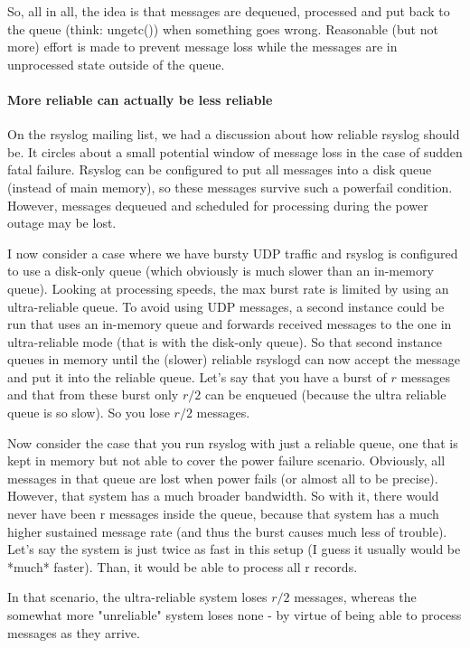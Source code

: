 \documentclass[a4paper,10pt]{article}
\begin{document}
So, all in all, the idea is that messages are dequeued, processed and put
back to the queue (think: ungetc()) when something goes wrong. Reasonable
(but not more) effort is made to prevent message loss while the messages are
in unprocessed state outside of the queue.

\paragraph{More reliable can actually be less reliable}
On the rsyslog mailing list, we had a discussion about how reliable rsyslog should be. It circles about a small potential window of message loss in the case of sudden fatal failure. Rsyslog can be configured to put all messages into a disk queue (instead of main memory), so these messages survive such a powerfail condition. However, messages dequeued and scheduled for processing during the power outage may be lost. 

I now consider a case where we have bursty UDP traffic and rsyslog is configured to use a disk-only queue (which obviously is much slower than an in-memory queue). Looking at processing speeds, the max burst rate is limited by using an ultra-reliable queue. To avoid using UDP messages, a second instance could be run that uses an in-memory queue and forwards received messages to the one in ultra-reliable mode (that is with the disk-only queue). So that second instance queues in memory until the (slower) reliable rsyslogd can now accept the message and put it into the reliable queue. Let's say that you have a burst of $r$ messages and that from these burst only $r/2$ can be enqueued (because the ultra reliable queue is so slow). So you lose $r/2$ messages.

Now consider the case that you run rsyslog with just a reliable queue, one that is kept in memory but not able to cover the power failure scenario. Obviously, all messages in that queue are lost when power fails (or almost all to be precise). However, that system has a much broader bandwidth. So with it, there would never have been r messages inside the queue, because that system has a much higher sustained message rate (and thus the burst causes much less of trouble). Let's say the system is just twice as fast in this setup (I guess it usually would be *much* faster). Than, it would be able to process all r records.

In that scenario, the ultra-reliable system loses $r/2$ messages, whereas the somewhat more "unreliable" system loses none - by virtue of being able to process messages as they arrive. 
\end{document}
